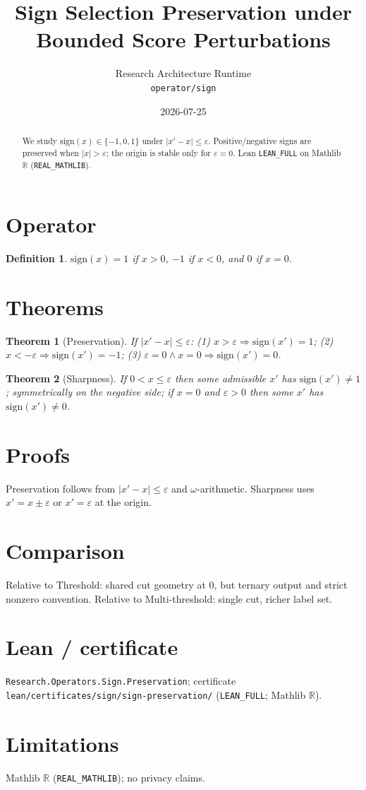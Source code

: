 \documentclass[11pt]{article}
\title{Sign Selection Preservation under Bounded Score Perturbations}
\author{Research Architecture Runtime \\ \texttt{operator/sign}}
\date{2026-07-25}
\newtheorem{theorem}{Theorem}
\newtheorem{definition}{Definition}
\begin{document}
\maketitle
\begin{abstract}
We study \(\mathrm{sign}(x)\in\{-1,0,1\}\) under \(\lvert x'-x\rvert\le\varepsilon\).
Positive/negative signs are preserved when \(\lvert x\rvert>\varepsilon\); the origin is
stable only for \(\varepsilon=0\). Lean \texttt{LEAN\_FULL} on Mathlib \(\mathbb{R}\)
(\texttt{REAL\_MATHLIB}).
\end{abstract}
\section{Operator}
\begin{definition}
\(\mathrm{sign}(x)=1\) if \(x>0\), \(-1\) if \(x<0\), and \(0\) if \(x=0\).
\end{definition}
\section{Theorems}
\begin{theorem}[Preservation]
If \(\lvert x'-x\rvert\le\varepsilon\): (1) \(x>\varepsilon\Rightarrow\mathrm{sign}(x')=1\);
(2) \(x<-\varepsilon\Rightarrow\mathrm{sign}(x')=-1\);
(3) \(\varepsilon=0\land x=0\Rightarrow\mathrm{sign}(x')=0\).
\end{theorem}
\begin{theorem}[Sharpness]
If \(0<x\le\varepsilon\) then some admissible \(x'\) has \(\mathrm{sign}(x')\ne 1\);
symmetrically on the negative side; if \(x=0\) and \(\varepsilon>0\) then some
\(x'\) has \(\mathrm{sign}(x')\ne 0\).
\end{theorem}
\section{Proofs}
Preservation follows from \(\lvert x'-x\rvert\le\varepsilon\) and \(\omega\)-arithmetic.
Sharpness uses \(x'=x\pm\varepsilon\) or \(x'=\varepsilon\) at the origin.
\section{Comparison}
Relative to Threshold: shared cut geometry at \(0\), but ternary output and strict
nonzero convention. Relative to Multi-threshold: single cut, richer label set.
\section{Lean / certificate}
\texttt{Research.Operators.Sign.Preservation}; certificate
\texttt{lean/certificates/sign/sign-preservation/} (\texttt{LEAN\_FULL}; Mathlib $\mathbb{R}$).
\section{Limitations}
Mathlib $\mathbb{R}$ (\texttt{REAL\_MATHLIB}); no privacy claims.
\end{document}
